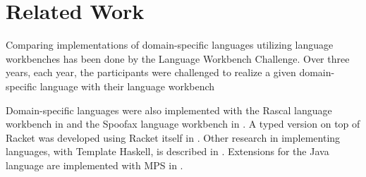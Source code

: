 \chapter{Related Work}

Comparing implementations of domain-specific languages utilizing language workbenches has been done by the Language Workbench Challenge.
Over three years, each year, the participants were challenged to realize a given domain-specific language with their language workbench \cite{erdweg2013state}

Domain-specific languages were also implemented with the Rascal language workbench in \cite{van2011rascal} and the Spoofax language workbench in \cite{kats2010spoofax}.
A typed version on top of Racket was developed using Racket itself in \cite{tobin2011languages}.
Other research in implementing languages, with Template Haskell, is described in \cite{mainland2007s}.
Extensions for the Java language are implemented with MPS in \cite{pech2013jetbrains}.

